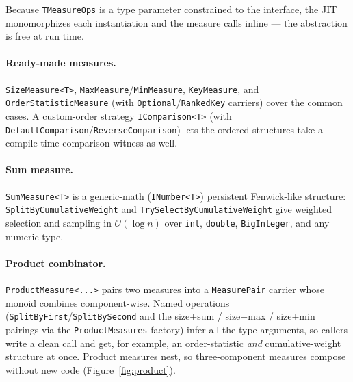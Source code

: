 \documentclass[11pt]{article}
\newcommand{\cs}[1]{\lstinline|#1|}
\newcommand{\bigO}{\ensuremath{\mathcal{O}}}
\begin{document}
Because \cs{TMeasureOps} is a type parameter constrained to the interface, the JIT monomorphizes each
instantiation and the measure calls inline --- the abstraction is free at run time.

\paragraph{Ready-made measures.} \cs{SizeMeasure<T>}, \cs{MaxMeasure}/\cs{MinMeasure}, \cs{KeyMeasure},
and \cs{OrderStatisticMeasure} (with \cs{Optional}/\cs{RankedKey} carriers) cover the common cases. A
custom-order strategy \cs{IComparison<T>} (with \cs{DefaultComparison}/\cs{ReverseComparison}) lets the
ordered structures take a compile-time comparison witness as well.

\paragraph{Sum measure.} \cs{SumMeasure<T>} is a generic-math (\cs{INumber<T>}) persistent
Fenwick-like structure: \cs{SplitByCumulativeWeight} and \cs{TrySelectByCumulativeWeight} give weighted
selection and sampling in $\bigO(\log n)$ over \cs{int}, \cs{double}, \cs{BigInteger}, and any numeric
type.

\paragraph{Product combinator.} \cs{ProductMeasure<...>} pairs two measures into a \cs{MeasurePair}
carrier whose monoid combines component-wise. Named operations (\cs{SplitByFirst}/\cs{SplitBySecond} and
the size$+$sum / size$+$max / size$+$min pairings via the \cs{ProductMeasures} factory) infer all the
type arguments, so callers write a clean call and get, for example, an order-statistic \emph{and}
cumulative-weight structure at once. Product measures nest, so three-component measures compose without
new code (Figure~\ref{fig:product}).
\end{document}
